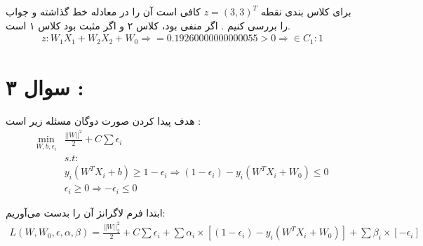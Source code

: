 \documentclass[a4paper, 12pt]{article}
\begin{document}
برای کلاس بندی نقطه 
$z = (3,3)^T$
کافی است آن را در معادله خط گذاشته و جواب را بررسی کنیم . اگر منفی بود، کلاس ۲ و اگر مثبت بود کلاس ۱ است. 
\begin{align*}
	z :  W_1 X_1 + W_2 X_2 + W_0 \Rightarrow = 0.19260000000000055 > 0  \Rightarrow \in C_1 : 1
\end{align*}

\section*{سوال ۳ : }

هدف پیدا کردن صورت دوگان مسئله زیر است :
\begin{align*}
	\min_{W,b,\epsilon_i}& \frac{||W||^2}{2} + C\sum \epsilon_i \\
	&s.t :\\
	&y_i(W^TX_i + b) \geq 1 - \epsilon_i \Rightarrow (1-\epsilon_i) - y_i(W^TX_i + W_0) \leq 0\\
	&\epsilon_i \geq 0 \Rightarrow -\epsilon_i \leq 0
\end{align*}

ابتدا فرم لاگرانژ آن را بدست می‌آوریم:
\begin{align*}
	L(W,W_0,\epsilon,\alpha,\beta) = \frac{||W||_2^2}{2} + C\sum \epsilon_i + \sum \alpha_i \times \left[(1-\epsilon_i) - y_i(W^TX_i + W_0) \right] + \sum \beta_i \times \left[-\epsilon_i\right]
\end{align*}
\end{document}

